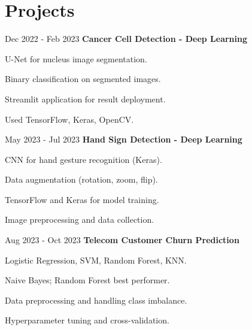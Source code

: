 \section{Projects}
\begin{twocolentry}{
    Dec 2022 - Feb 2023
}
    \textbf{Cancer Cell Detection - Deep Learning}\end{twocolentry}
\vspace{0.10 cm}
\begin{onecolentry}
    \begin{highlights}
        \item U-Net for nucleus image segmentation.
        \item Binary classification on segmented images.
        \item Streamlit application for result deployment.
        \item Used TensorFlow, Keras, OpenCV.
    \end{highlights}
\end{onecolentry}
\vspace{0.2 cm}
\begin{twocolentry}{
    May 2023 - Jul 2023
}
    \textbf{Hand Sign Detection - Deep Learning}\end{twocolentry}
\vspace{0.10 cm}
\begin{onecolentry}
    \begin{highlights}
        \item CNN for hand gesture recognition (Keras).
        \item Data augmentation (rotation, zoom, flip).
        \item TensorFlow and Keras for model training.
        \item Image preprocessing and data collection.
    \end{highlights}
\end{onecolentry}
\vspace{0.2 cm}
\begin{twocolentry}{
    Aug 2023 - Oct 2023
}
    \textbf{Telecom Customer Churn Prediction}\end{twocolentry}
\vspace{0.10 cm}
\begin{onecolentry}
    \begin{highlights}
        \item Logistic Regression, SVM, Random Forest, KNN.
        \item Naive Bayes; Random Forest best performer.
        \item Data preprocessing and handling class imbalance.
        \item Hyperparameter tuning and cross-validation.
    \end{highlights}
\end{onecolentry}
